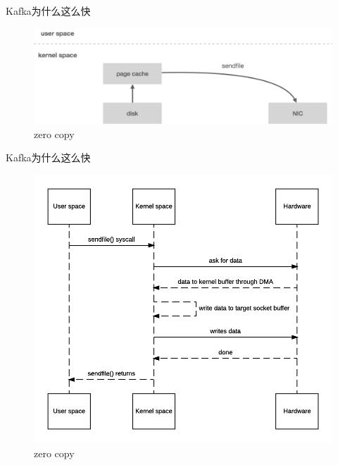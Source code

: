 \begin{frame}[plain,t]{Kafka为什么这么快} %
     \\  \vspace{2ex}
    \begin{figure}
        \centering
        \includegraphics[width=0.9\linewidth]{image/0405}
        \caption{zero copy}
        \label{fig:0405}
    \end{figure}
    
    
\end{frame}
\begin{frame}[plain,t]{Kafka为什么这么快} %
     \\  \vspace{2ex}
    \begin{figure}
        \centering
        \includegraphics[width=0.7\linewidth]{image/0408}
        \caption{zero copy}
        \label{fig:0408}
    \end{figure}
    
    
\end{frame}
